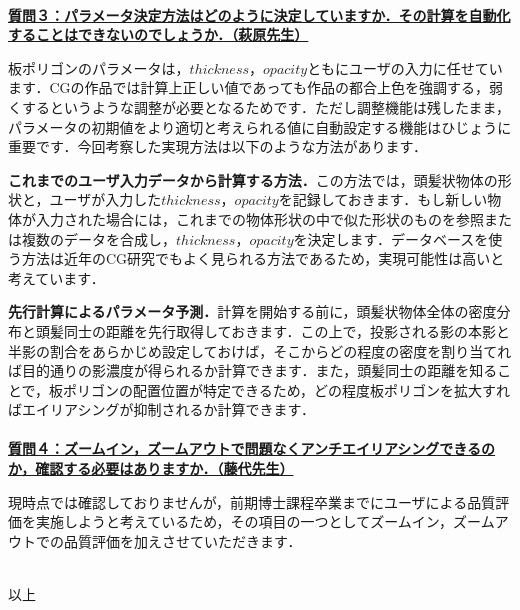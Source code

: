 \documentclass[a4j,10pt]{jsarticle}
\begin{document}
\\
\textbf{\underline{質問３：パラメータ決定方法はどのように決定していますか．その計算を自動化することはできないのでしょうか．（萩原先生）}}\par
板ポリゴンのパラメータは，$thickness$，$opacity$ともにユーザの入力に任せています．CGの作品では計算上正しい値であっても作品の都合上色を強調する，弱くするというような調整が必要となるためです．ただし調整機能は残したまま，パラメータの初期値をより適切と考えられる値に自動設定する機能はひじょうに重要です．今回考察した実現方法は以下のような方法があります．\par
\textbf{これまでのユーザ入力データから計算する方法．}この方法では，頭髪状物体の形状と，ユーザが入力した$thickness$，$opacity$を記録しておきます．もし新しい物体が入力された場合には，これまでの物体形状の中で似た形状のものを参照または複数のデータを合成し，$thickness$，$opacity$を決定します．データベースを使う方法は近年のCG研究でもよく見られる方法であるため，実現可能性は高いと考えています．\par
\textbf{先行計算によるパラメータ予測．}計算を開始する前に，頭髪状物体全体の密度分布と頭髪同士の距離を先行取得しておきます．この上で，投影される影の本影と半影の割合をあらかじめ設定しておけば，そこからどの程度の密度を割り当てれば目的通りの影濃度が得られるか計算できます．また，頭髪同士の距離を知ることで，板ポリゴンの配置位置が特定できるため，どの程度板ポリゴンを拡大すればエイリアシングが抑制されるか計算できます．\\
\\
%
\textbf{\underline{質問４：ズームイン，ズームアウトで問題なくアンチエイリアシングできるのか，確認する必要はありますか．（藤代先生）}}\par
現時点では確認しておりませんが，前期博士課程卒業までにユーザによる品質評価を実施しようと考えているため，その項目の一つとしてズームイン，ズームアウトでの品質評価を加えさせていただきます．\\
\\
\begin{flushright}
以上
\end{flushright}
\end{document}
